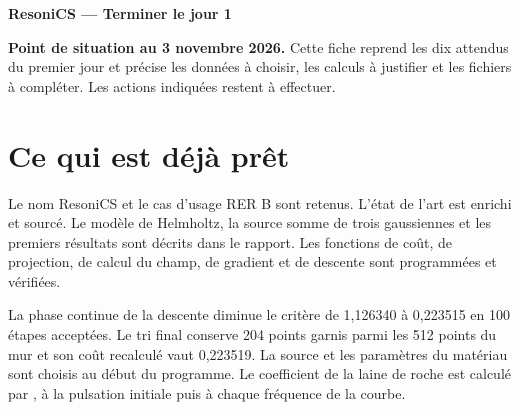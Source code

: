 \documentclass[10pt,a4paper]{article}
\newcommand{\code}[1]{\texttt{\detokenize{#1}}}
\begin{document}
{\LARGE\bfseries ResoniCS --- Terminer le jour 1}\par
\textbf{Point de situation au 3 novembre 2026.} Cette fiche reprend les dix attendus du premier jour et précise les données à choisir, les calculs à justifier et les fichiers à compléter. Les actions indiquées restent à effectuer.

\section*{Ce qui est déjà prêt}
Le nom ResoniCS et le cas d'usage RER B sont retenus. L'état de l'art est enrichi et sourcé. Le modèle de Helmholtz, la source somme de trois gaussiennes et les premiers résultats sont décrits dans le rapport. Les fonctions de coût, de projection, de calcul du champ, de gradient et de descente sont programmées et vérifiées.

La phase continue de la descente diminue le critère de 1,126340 à 0,223515 en 100 étapes acceptées. Le tri final conserve 204 points garnis parmi les 512 points du mur et son coût recalculé vaut 0,223519. La source et les paramètres du matériau sont choisis au début du programme. Le coefficient de la laine de roche est calculé par \code{compute_alpha}, à la pulsation initiale puis à chaque fréquence de la courbe.
\end{document}
